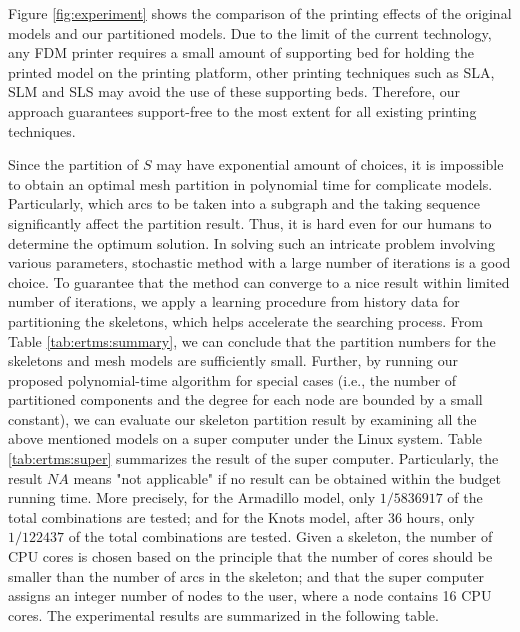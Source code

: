 Figure \ref{fig:experiment} shows the comparison of the printing effects of the original models and our partitioned models. Due to the limit of the current technology, any FDM printer requires a small amount of supporting bed for holding the printed model on the printing platform, other printing techniques such as SLA, SLM and SLS may avoid the use of these supporting beds. Therefore, our approach guarantees support-free to the most extent for all existing printing techniques.

Since the partition of $S$ may have exponential amount of choices, it is impossible to obtain an optimal mesh partition in polynomial time for complicate models. Particularly, which arcs to be taken into a subgraph and the taking sequence significantly affect the partition result. Thus, it is hard even for our humans to determine the optimum solution. In solving such an intricate problem involving various parameters, stochastic method with a large number of iterations is a good choice. To guarantee that the method can converge to a nice result within limited number of iterations, {\color{red}we apply a learning procedure from history data for partitioning the skeletons}, which helps accelerate the searching process. From Table \ref{tab:ertms:summary}, we can conclude that the partition numbers for the skeletons and mesh models are sufficiently small. Further, by running our proposed polynomial-time algorithm for special cases (i.e., the number of partitioned components and the degree for each node are bounded by a small constant), we can evaluate our skeleton partition result by examining all the above mentioned models on a super computer under the Linux system. Table \ref{tab:ertms:super} summarizes the result of the super computer. Particularly, the result $NA$ means "not applicable" if no result can be obtained within the budget running time. More precisely, for the Armadillo model, only $1/5836917$ of the total combinations are tested; and for the Knots model, after 36 hours, only $1/122437$ of the total combinations are tested. Given a skeleton, the number of CPU cores is chosen based on the principle that the number of cores should be smaller than the number of arcs in the skeleton; and that the super computer assigns an integer number of nodes to the user, where a node contains 16 CPU cores. The experimental results are summarized in the following table.

